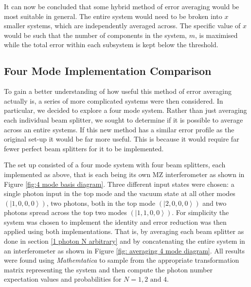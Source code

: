 \documentclass[aps,pra,twocolumn,superscriptaddress,numerical]{revtex4-1}
\begin{document}
		
		It can now be concluded that some hybrid method of error averaging would be most suitable in general. The entire system would need to be broken into $x$ smaller systems, which are independently averaged across. The specific value of $x$ would be such that the number of components in the system, $m$, is maximised while the total error within each subsystem is kept below the threshold.
		
		\subsection{Four Mode Implementation Comparison \label{Four Mode Impementation Comparison}}
		
		To gain a better understanding of how useful this method of error averaging actually is, a series of more complicated systems were then considered. In particular, we decided to explore a four mode system. Rather than just averaging each individual beam splitter, we sought to determine if it is possible to average across an entire systems. If this new method has a similar error profile as the original set-up it would be far more useful. This is because it would require far fewer perfect beam splitters for it to be implemented.
		
		The set up consisted of a four mode system with four beam splitters, each implemented as above, that is each being its own MZ interferometer as shown in Figure \ref{fig:4 mode basis diagram}. Three different input states were chosen: a single photon input in the top mode and the vacuum state at all other modes$\left(\left|1,0,0,0\right\rangle \right)$, two photons, both in the top mode $\left(\left|2,0,0,0\right\rangle \right)$ and two photons spread across the top two modes $\left(\left|1,1,0,0\right\rangle \right)$. For simplicity the system was chosen to implement the identity and error reduction was then applied using both implementations. That is, by averaging each beam splitter as done in section \ref{1 photon N arbitrary} and by concatenating the entire system in an interferometer as shown in Figure \ref{fig: averaging 4 mode diagram}. All results were found using \textit{Mathemtatica} to sample from the appropriate transformation matrix representing the system and then compute the photon number expectation values and probabilities for $N=1, 2 \textrm{ and } 4$.
		
\end{document}
